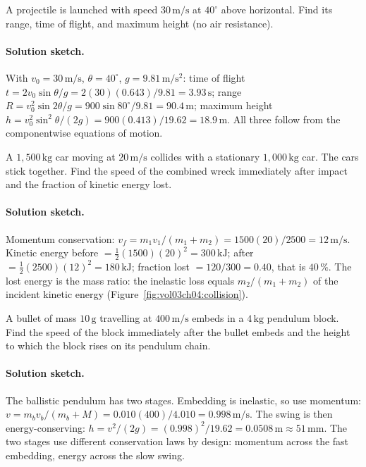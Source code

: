 \begin{exercise}
A projectile is launched with speed $30\,\si{\meter\per\second}$ at
$40^{\circ}$ above horizontal. Find its range, time of flight, and
maximum height (no air resistance).
\paragraph{Solution sketch.} With $v_{0}=30\,\si{\meter\per\second}$,
$\theta=40^{\circ}$, $g=9.81\,\si{\meter\per\second\squared}$:
time of flight $t=2v_{0}\sin\theta/g=2(30)(0.643)/9.81=3.93\,\si{
\second}$; range $R=v_{0}^{2}\sin 2\theta/g=900\sin 80^{\circ}/9.81=
90.4\,\si{\meter}$; maximum height $h=v_{0}^{2}\sin^{2}\theta/(2g)=
900(0.413)/19.62=18.9\,\si{\meter}$. All three follow from the
componentwise equations of motion.
\end{exercise}

\begin{exercise}
A $1{,}500\,\si{\kilogram}$ car moving at $20\,\si{\meter\per\second}$
collides with a stationary $1{,}000\,\si{\kilogram}$ car. The cars
stick together. Find the speed of the combined wreck immediately
after impact and the fraction of kinetic energy lost.
\paragraph{Solution sketch.} Momentum conservation:
$v_{f}=m_{1}v_{1}/(m_{1}+m_{2})=1500(20)/2500=12\,\si{\meter\per
\second}$. Kinetic energy before $=\tfrac{1}{2}(1500)(20)^{2}=
300\,\si{\kilo\joule}$; after $=\tfrac{1}{2}(2500)(12)^{2}=180\,\si{
\kilo\joule}$; fraction lost $=120/300=0.40$, that is $40\,\%$. The
lost energy is the mass ratio: the inelastic loss equals
$m_{2}/(m_{1}+m_{2})$ of the incident kinetic energy
(Figure~\ref{fig:vol03ch04:collision}).
\end{exercise}

\begin{exercise}
A bullet of mass $10\,\si{\gram}$ travelling at $400\,\si{\meter\per
\second}$ embeds in a $4\,\si{\kilogram}$ pendulum block. Find the
speed of the block immediately after the bullet embeds and the
height to which the block rises on its pendulum chain.
\paragraph{Solution sketch.} The ballistic pendulum has two stages.
Embedding is inelastic, so use momentum: $v=m_{b}v_{b}/(m_{b}+M)=
0.010(400)/4.010=0.998\,\si{\meter\per\second}$. The swing is then
energy-conserving: $h=v^{2}/(2g)=(0.998)^{2}/19.62=0.0508\,\si{\meter}
\approx 51\,\si{\milli\meter}$. The two stages use different
conservation laws by design: momentum across the fast embedding,
energy across the slow swing.
\end{exercise}

